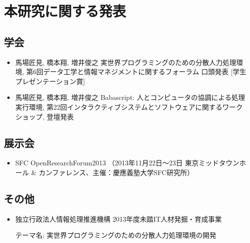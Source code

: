 \chapter{本研究に関する発表}
\label{chap:publications}

\section{学会}
\begin{itemize}
  \item 馬場匠見, 橋本翔, 増井俊之 実世界プログラミングのための分散人力処理環境,
        第6回データ工学と情報マネジメントに関するフォーラム 口頭発表
        [学生プレゼンテーション賞]
  \item 馬場匠見, 橋本翔, 増井俊之 Babascript: 人とコンピュータの協調による処理実行環境,
        第22回インタラクティブシステムとソフトウェアに関するワークショップ, 登壇発表
\end{itemize}

\section{展示会}
\begin{itemize}
  \item SFC OpenResearchForum2013 （2013年11月22日〜23日 東京ミッドタウンホール \& カンファレンス、主催：慶應義塾大学SFC研究所）
\end{itemize}

\section{その他}
\begin{itemize}
  \item 独立行政法人情報処理推進機構 2013年度未踏IT人材発掘・育成事業

        テーマ名: 実世界プログラミングのための分散人力処理環境の開発
\end{itemize}
